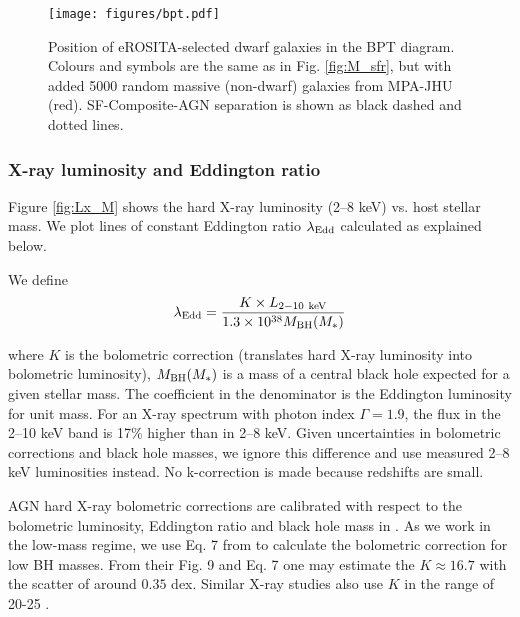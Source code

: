 \documentclass[fleqn,usenatbib]{mnras}
\newcommand{\sbyk}[1]{\textcolor{OliveGreen}{{SB: \bf||#1||}}}
\newcommand{\mg}[1]{\textcolor{blue}{{MG: \bf||#1||}}}
\begin{document}
\begin{figure}
    \texttt{[image: figures/bpt.pdf]}
    \caption[[Dwarf galaxies BPT diagram.]{Position of eROSITA-selected dwarf galaxies in the BPT diagram. Colours and symbols are the same as in Fig. \ref{fig:M_sfr}, but with added 5000 random massive (non-dwarf) galaxies from MPA-JHU (red). SF-Composite-AGN separation is shown as black dashed and dotted lines.}
    \label{fig:bpt}
\end{figure}


\subsubsection{X-ray luminosity and Eddington ratio}
\label{sect:results:optical:eddington}


Figure \ref{fig:Lx_M} shows the hard X-ray luminosity (2--8 keV) vs. host stellar mass. We plot lines of constant Eddington ratio $\lambda_{\rm Edd}$ \citep[see][]{Aird2012, Birchall2020, Birchall2022, Zou2023} calculated as explained below.


We define
$$
\lambda_{\rm Edd} = \frac{K\times L_{\rm 2-10~keV}}{1.3\times10^{38} M_{\rm BH}(M_*)}
$$

where $K$ is the bolometric correction (translates hard X-ray luminosity into bolometric luminosity), $M_{\rm BH}(M_*)$ is a mass of a central black hole expected for a given stellar mass. The coefficient in the denominator is the Eddington luminosity for unit mass.
For an X-ray spectrum with photon index $\Gamma=1.9$, the flux in the 2--10 keV band is 17\% higher than in 2--8 keV. Given uncertainties in bolometric corrections and black hole masses, we ignore this difference and use measured 2--8 keV luminosities instead. No k-correction is made because redshifts are small.



AGN hard X-ray bolometric corrections are calibrated with respect to the bolometric luminosity, Eddington ratio and black hole mass in \citet{Duras2020}. As we work in the low-mass regime, we use Eq. 7 from \citeauthor{Duras2020} to calculate the bolometric correction for low BH masses. From their Fig. 9 and Eq. 7 one may estimate the $K\approx 16.7$ with the scatter of around $0.35$ dex. Similar X-ray studies also use $K$ in the range of 20-25 \citep{Birchall2020, Latimer2021, Zou2023}. 
\end{document}
